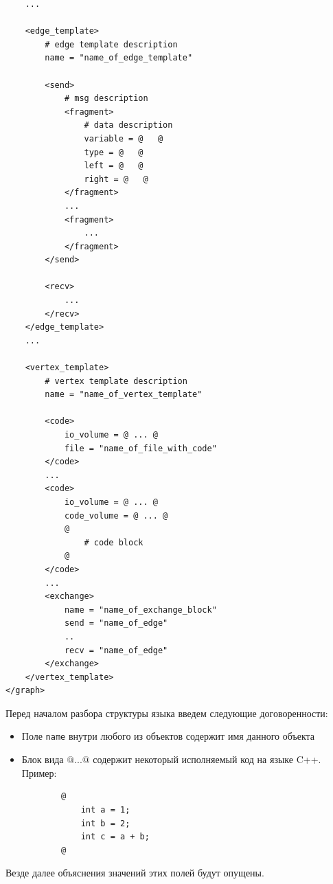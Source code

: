 \documentclass[a4paper, 12pt]{article}
\begin{document}
\begin{lstlisting}
	...
	
	<edge_template>
		# edge template description 
		name = "name_of_edge_template"
		
		<send>
			# msg description
			<fragment>
				# data description
				variable = @   @
				type = @   @
				left = @   @
				right = @   @
			</fragment>
			...
			<fragment>
				...
			</fragment>
		</send>
		
		<recv>
			...
		</recv>
	</edge_template>
	...
	
	<vertex_template>
		# vertex template description 
		name = "name_of_vertex_template"
		
		<code>
			io_volume = @ ... @
			file = "name_of_file_with_code"
		</code>
		...
		<code>
			io_volume = @ ... @
			code_volume = @ ... @
			@
				# code block
			@
		</code>
		...
		<exchange>
			name = "name_of_exchange_block"
			send = "name_of_edge"
			..
			recv = "name_of_edge"
		</exchange>
	</vertex_template>
</graph>
\end{lstlisting}
Перед началом разбора структуры языка введем следующие договоренности:
\begin{itemize}
	\item Поле \lstinline$name$ внутри любого из объектов содержит имя данного объекта
	\item Блок вида $@$...$@$ содержит некоторый исполняемый код на языке C++. Пример:
	\begin{lstlisting}
		@
			int a = 1;
			int b = 2;
			int c = a + b;
		@
	\end{lstlisting}
\end{itemize}
Везде далее объяснения значений этих полей будут опущены.
\end{document}
